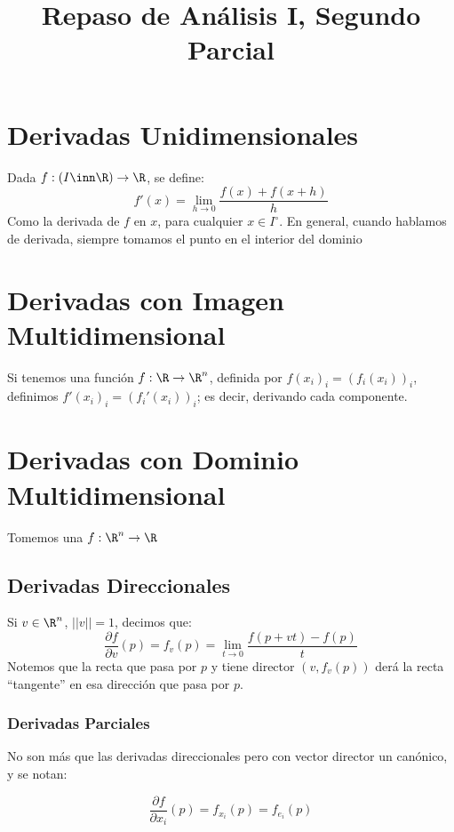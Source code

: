 \documentclass{article}
\title{Repaso de Análisis I, Segundo Parcial}
\begin{document}
    \maketitle
    \section*{Derivadas Unidimensionales}
    \begin{defi}
    Dada $f : (I \inn \R) \to \R$, se define:
    \[
        f'(x) = \lim_{h \to 0} \frac{f(x) + f(x+h)}{h}
    \]
    Como la derivada de $f$ en $x$, para cualquier $x \in I^\circ$. En general, cuando hablamos de derivada, siempre tomamos el punto en el interior del dominio
    \end{defi}
    \section*{Derivadas con Imagen Multidimensional}
    Si tenemos una función $f : \R \to \R^n$, definida por $f(x_i)_i = (f_i(x_i))_i$, definimos $f'(x_i)_i = (f_i'(x_i))_i$; es decir, derivando cada componente.

    \section*{Derivadas con Dominio Multidimensional}
    Tomemos una $f : \R^n \to \R$
    \subsection*{Derivadas Direccionales}
    Si $v \in \R^n$, $||v|| = 1$, decimos que:
    \[
        \frac{\partial f}{\partial v}(p) = f_v(p) = \lim_{t \to 0} \frac{f(p + vt) - f(p)}{t}
    \]
    Notemos que la recta que pasa por $p$ y tiene director $(v, f_v(p))$ derá la recta ``tangente'' en esa dirección que pasa por $p$.
    \subsubsection*{Derivadas Parciales}
    No son más que las derivadas direccionales pero con vector director un canónico, y se notan:
    \begin{nota}
    \[
        \frac{\partial f}{\partial x_i}(p) = f_{x_i}(p) = f_{e_i}(p)
    \]
    \end{nota}
\end{document}
